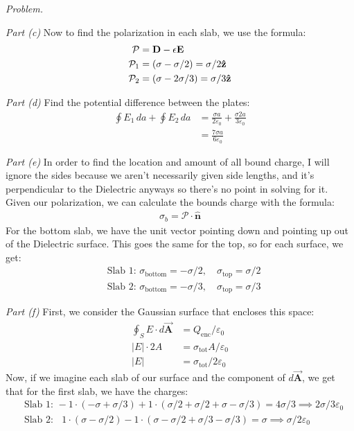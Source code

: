 \documentclass[10pt,oneside]{book}
\newcommand{\gspc}{\vspace{0.13cm}} %
\newcommand{\gline}[0]{\gspc\\} %
\newenvironment{problem}[1]
  {\vspace{-0.1cm}\begin{tcolorbox}[problembox]
   \textit{Problem. }#1}
  {\end{tcolorbox}\gspc}
\newenvironment{subproblem}[2]
  {\vspace{-0.1cm}\begin{tcolorbox}[subproblembox]
   \textit{#1 }#2}
  {\end{tcolorbox}\gspc}
\newcommand{\vA}{\vec{\mathbf{A}}}
\newcommand{\unit}[1]{\mathbf{\hat{#1}}}
\begin{document}
\begin{problem}
  \begin{subproblem}{Part (c)}
    Now to find the polarization in each slab, we use the formula:
    \begin{align*}
      \mathcal P&=\mathbf D - \epsilon\vE\\
      \mathcal P_1 &= (\sigma - \sigma/2) = \sigma/2\unit{z}\\
      \mathcal P_2 &= (\sigma - 2\sigma/3) = \sigma/3\unit{z}
    \end{align*}
  \end{subproblem}
  \begin{subproblem}{Part (d)}
    Find the potential difference between the plates:
    \begin{align*}
      \oint E_1 \, da+ \oint E_2\, da &= \frac{\sigma a}{2\varepsilon_0} + \frac{\sigma 2a}{3\varepsilon_0}\\
      &=\frac{7\sigma a}{6\varepsilon_0}
    \end{align*}
  \end{subproblem}
  \begin{subproblem}{Part (e)}
    In order to find the location and amount of all bound charge, I will ignore the sides because we aren't necessarily given side lengths, and it's perpendicular to the Dielectric anyways so there's no point in solving for it.\gline{}
    Given our polarization, we can calculate the bounds charge with the formula:
    \begin{align*}
      \sigma_b = \mathcal P \cdot \unit{n}
    \end{align*}
    For the bottom slab, we have the unit vector pointing down and pointing up out of the Dielectric surface. This goes the same for the top, so for each surface, we get:
    \begin{align*}
      &\text{Slab 1: }\sigma_\text{bottom} = -\sigma/2,\quad \sigma_\text{top} = \sigma/2\\
      &\text{Slab 2: }\sigma_\text{bottom} = -\sigma/3,\quad \sigma_\text{top} = \sigma/3
    \end{align*}
  \end{subproblem}
  \begin{subproblem}{Part (f)}
    First, we consider the Gaussian surface that encloses this space:
    \begin{align*}
      \oint_S E\cdot d\vA &= Q_\text{enc}/\varepsilon_0\\
      |E|\cdot 2A&= \sigma_\text{tot} A/\varepsilon_0\\
      |E|&= \sigma_\text{tot}/2\varepsilon_0
    \end{align*}
    Now, if we imagine each slab of our surface and the component of $d\vA$, we get that for the first slab, we have the charges:
    \begin{align*}
      &\text{Slab 1: }-1\cdot(-\sigma + \sigma/3) + 1\cdot(\sigma/2 + \sigma/2 + \sigma - \sigma/3) = 4\sigma/3 \implies 2\sigma/3\varepsilon_0\\
      &\text{Slab 2: }\;\;1\cdot(\sigma - \sigma/2)-1\cdot(\sigma - \sigma/2 + \sigma/3 - \sigma/3)= \sigma \implies \sigma/2\varepsilon_0
    \end{align*}
  \end{subproblem}


\end{problem}
\end{document}
